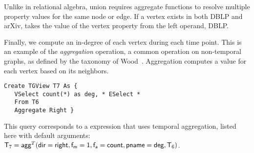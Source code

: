 Unlike in relational algebra, \tga union requires aggregate functions
to resolve multiple property values for the same node or edge.  If a
vertex exists in both DBLP and arXiv,  takes the value of
the vertex property  from the left operand, DBLP.


\begin{example}
\label{ex:agg}

Finally, we compute an in-degree of each vertex during each time
point.  This is an example of the {\em aggregation} operation, a
common operation on non-temporal graphs, as defined by the taxonomy of
Wood~\cite{Wood2012}.  Aggregation computes a value for each vertex
based on its neighbors.

\begin{small} 
\begin{verbatim}
Create TGView T7 As { 
   VSelect count(*) as deg, * ESelect *
   From T6
   Aggregate Right }
\end{verbatim}
\end{small}

This query corresponds to a \tga expression that uses temporal
aggregation, listed here with default arguments: $\mathsf{T}_7 =
\textsf{agg}^T(\mathsf{dir=right},\mathsf{f_m=1},\mathsf{f_a=count},\mathsf{pname=deg},\mathsf{T}_6)$.

\end{example}



